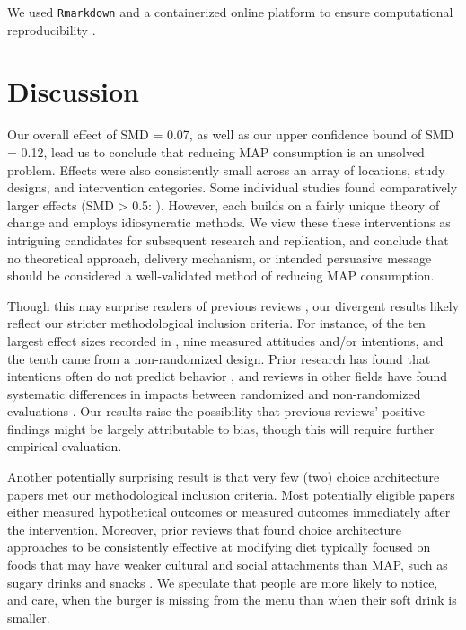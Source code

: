 \documentclass[sn-nature,referee,pdflatex]{sn-jnl}
\begin{document}
We used \texttt{Rmarkdown} \citep{xie2018} and a containerized online
platform \citep{moreau2023, clyburne2019} to ensure computational
reproducibility \citep{polanin2020}.

\section{Discussion}\label{discussion}

Our overall effect of SMD = 0.07, as well as our upper confidence bound
of SMD = 0.12, lead us to conclude that reducing MAP consumption is an
unsolved problem. Effects were also consistently small across an array
of locations, study designs, and intervention categories. Some
individual studies found comparatively larger effects (SMD
\textgreater{} 0.5:
\citep{carfora2023, merrill2009, kanchanachitra2020, bianchi2022, piester2020}).
However, each builds on a fairly unique theory of change and employs
idiosyncratic methods. We view these these interventions as intriguing
candidates for subsequent research and replication, and conclude that no
theoretical approach, delivery mechanism, or intended persuasive message
should be considered a well-validated method of reducing MAP
consumption.

Though this may surprise readers of previous reviews
\citep{mathur2021meta, meier2022, mertens2022}, our divergent results
likely reflect our stricter methodological inclusion criteria. For
instance, of the ten largest effect sizes recorded in
\citep{mathur2021effectiveness}, nine measured attitudes and/or
intentions, and the tenth came from a non-randomized design. Prior
research has found that intentions often do not predict behavior
\citep{mathur2021effectiveness}, and reviews in other fields have found
systematic differences in impacts between randomized and non-randomized
evaluations \citep{porat2024, stevenson2023}. Our results raise the
possibility that previous reviews' positive findings might be largely
attributable to bias, though this will require further empirical
evaluation.

Another potentially surprising result is that very few (two) choice
architecture papers met our methodological inclusion criteria. Most
potentially eligible papers either measured hypothetical outcomes or
measured outcomes immediately after the intervention. Moreover, prior
reviews that found choice architecture approaches to be consistently
effective at modifying diet typically focused on foods that may have
weaker cultural and social attachments than MAP, such as sugary drinks
and snacks \citep{venema2020, adriaanse2009}. We speculate that people
are more likely to notice, and care, when the burger is missing from the
menu than when their soft drink is smaller.
\end{document}
